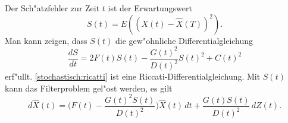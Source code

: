 Der Sch"atzfehler zur Zeit $t$ ist der Erwartungswert
\[
S(t) = E((X(t)-\hat X(T))^2).
\]
Man kann zeigen, dass $S(t)$ die gew"ohnliche Differentialgleichung
\begin{equation}
\frac{dS}{dt}
=
2F(t)S(t) - \frac{G(t)^2}{D(t)^2}S(t)^2 +C(t)^2
\label{stochastisch:ricatti}
\end{equation}
erf"ullt.
\eqref{stochastisch:ricatti} ist eine Riccati-Differentialgleichung.
Mit $S(t)$ kann das Filterproblem gel"ost werden, es gilt
\begin{equation}
d\hat X(t)
=
\biggl(F(t)-\frac{G(t)^2S(t)}{D(t)^2}\biggr)\hat X(t)\,dt 
+
\frac{G(t)S(t)}{D(t)^2}\,dZ(t).
\end{equation}






